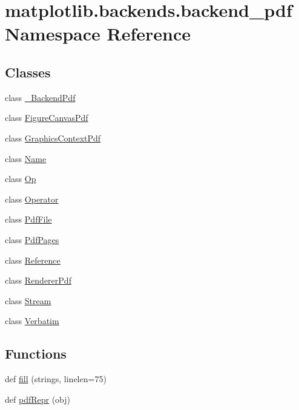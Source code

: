 \hypertarget{namespacematplotlib_1_1backends_1_1backend__pdf}{}\section{matplotlib.\+backends.\+backend\+\_\+pdf Namespace Reference}
\label{namespacematplotlib_1_1backends_1_1backend__pdf}
\subsection*{Classes}
\begin{DoxyCompactItemize}
\item 
class \hyperlink{classmatplotlib_1_1backends_1_1backend__pdf_1_1__BackendPdf}{\+\_\+\+Backend\+Pdf}
\item 
class \hyperlink{classmatplotlib_1_1backends_1_1backend__pdf_1_1FigureCanvasPdf}{Figure\+Canvas\+Pdf}
\item 
class \hyperlink{classmatplotlib_1_1backends_1_1backend__pdf_1_1GraphicsContextPdf}{Graphics\+Context\+Pdf}
\item 
class \hyperlink{classmatplotlib_1_1backends_1_1backend__pdf_1_1Name}{Name}
\item 
class \hyperlink{classmatplotlib_1_1backends_1_1backend__pdf_1_1Op}{Op}
\item 
class \hyperlink{classmatplotlib_1_1backends_1_1backend__pdf_1_1Operator}{Operator}
\item 
class \hyperlink{classmatplotlib_1_1backends_1_1backend__pdf_1_1PdfFile}{Pdf\+File}
\item 
class \hyperlink{classmatplotlib_1_1backends_1_1backend__pdf_1_1PdfPages}{Pdf\+Pages}
\item 
class \hyperlink{classmatplotlib_1_1backends_1_1backend__pdf_1_1Reference}{Reference}
\item 
class \hyperlink{classmatplotlib_1_1backends_1_1backend__pdf_1_1RendererPdf}{Renderer\+Pdf}
\item 
class \hyperlink{classmatplotlib_1_1backends_1_1backend__pdf_1_1Stream}{Stream}
\item 
class \hyperlink{classmatplotlib_1_1backends_1_1backend__pdf_1_1Verbatim}{Verbatim}
\end{DoxyCompactItemize}
\subsection*{Functions}
\begin{DoxyCompactItemize}
\item 
def \hyperlink{namespacematplotlib_1_1backends_1_1backend__pdf_a621a4549ad3b8bd5c759541aa1739fa4}{fill} (strings, linelen=75)
\item 
def \hyperlink{namespacematplotlib_1_1backends_1_1backend__pdf_a4c94908a6c63df6232edbc7792e35464}{pdf\+Repr} (obj)
\end{DoxyCompactItemize}
